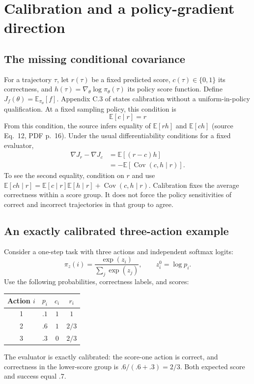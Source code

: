 \documentclass[11pt]{article}
\newcommand{\E}{\mathbb E}
\newcommand{\Cov}{\operatorname{Cov}}
\begin{document}
\section{Calibration and a policy-gradient direction}
\label{sec:calibration}

\subsection{The missing conditional covariance}
For a trajectory $\tau$, let $r(\tau)$ be a fixed predicted score, $c(\tau)\in\{0,1\}$ its correctness, and
$h(\tau)=\nabla_\theta\log\pi_\theta(\tau)$ its policy score function. Define $J_f(\theta)=\E_{\pi_\theta}[f]$. Appendix C.3 of \citet{Shum2026SWE_RM} states calibration without a uniform-in-policy qualification. At a fixed sampling policy, this condition is
\begin{equation}
\E[c\mid r]=r
\label{eq:calibration}
\end{equation}
From this condition, the source infers equality of $\E[rh]$ and $\E[ch]$ (source Eq.~12, PDF p.~16). Under the usual differentiability conditions for a fixed evaluator,
\begin{align}
\nabla J_r-\nabla J_c
 &=\E[(r-c)h] \nonumber\\
 &=-\E[\Cov(c,h\mid r)].
\label{eq:covariance}
\end{align}
To see the second equality, condition on $r$ and use
$\E[ch\mid r]=\E[c\mid r]\E[h\mid r]+\Cov(c,h\mid r)$.
Calibration fixes the average correctness within a score group. It does not force the policy sensitivities of correct and incorrect trajectories in that group to agree.

\subsection{An exactly calibrated three-action example}
Consider a one-step task with three actions and independent softmax logits:
\[
\pi_z(i)=\frac{\exp(z_i)}{\sum_j\exp(z_j)},\qquad z_i^0=\log p_i.
\]
Use the following probabilities, correctness labels, and scores:
\begin{center}
\begin{tabular}{cccc}
\toprule
Action $i$ & $p_i$ & $c_i$ & $r_i$\\
\midrule
1 & $.1$ & $1$ & $1$\\
2 & $.6$ & $1$ & $2/3$\\
3 & $.3$ & $0$ & $2/3$\\
\bottomrule
\end{tabular}
\end{center}
The evaluator is exactly calibrated: the score-one action is correct, and correctness in the lower-score group is $.6/(.6+.3)=2/3$. Both expected score and success equal $.7$.
\end{document}
